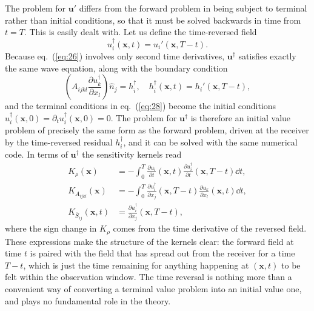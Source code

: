 The problem for $\mathbf{u}'$ differs from the forward problem in being subject to terminal rather than initial conditions, 
so that it must be solved backwards in time from $t=T$. This is easily dealt with. Let us define the time-reversed field
\begin{equation}
u_{i}^{\dagger}(\mathbf{x},t)=u_{i}'(\mathbf{x},T-t).
\label{eq:33a}
\end{equation}
Because eq.~(\ref{eq:26}) involves only second time derivatives, $\mathbf{u}^{\dagger}$ satisfies exactly the same wave equation, 
along with the boundary condition
\begin{equation}
\left(A_{ijkl}\frac{\partial u_{k}^{\dagger}}{\partial x_{l}}\right)\hat{n}_{j}=h_{i}^{\dagger}, \quad 
h_{i}^{\dagger}(\mathbf{x},t)=h_{i}'(\mathbf{x},T-t),
\label{eq:33b}
\end{equation}
and the terminal conditions in eq.~(\ref{eq:28}) become the initial conditions 
$u_{i}^{\dagger}(\mathbf{x},0)=\partial_{t}u_{i}^{\dagger}(\mathbf{x},0)=0$. The problem for $\mathbf{u}^{\dagger}$ is therefore an 
initial value problem of precisely the same form as the forward problem, driven at the receiver by the time-reversed residual 
$h_{i}^{\dagger}$, and it can be solved with the same numerical code. In terms of $\mathbf{u}^{\dagger}$ the sensitivity kernels read
\begin{align}
K_{\rho}(\mathbf{x})&=-\int_{0}^{T}\frac{\partial u_{i}}{\partial t}(\mathbf{x},t)\frac{\partial u_{i}^{\dagger}}{\partial t}(\mathbf{x},T-t)\dd t, \label{eq:33c} \\
K_{A_{ijkl}}(\mathbf{x})&=-\int_{0}^{T}\frac{\partial u_{i}^{\dagger}}{\partial x_{j}}(\mathbf{x},T-t)\frac{\partial u_{k}}{\partial x_{l}}(\mathbf{x},t)\dd t, \label{eq:33d} \\
K_{\overline{S}_{ij}}(\mathbf{x},t)&= \frac{\partial u_{i}^{\dagger}}{\partial x_{j}}(\mathbf{x},T-t),
\label{eq:33e}
\end{align}
where the sign change in $K_{\rho}$ comes from the time derivative of the reversed field. These expressions make the 
structure of the kernels clear: the forward field at time $t$ is paired with the field that has spread out from the receiver 
for a time $T-t$, which is just the time remaining for anything happening at $(\mathbf{x},t)$ to be felt within the observation window. 
The time reversal is nothing more than a convenient way of converting a terminal value problem into an initial value one, and 
plays no fundamental role in the theory.

